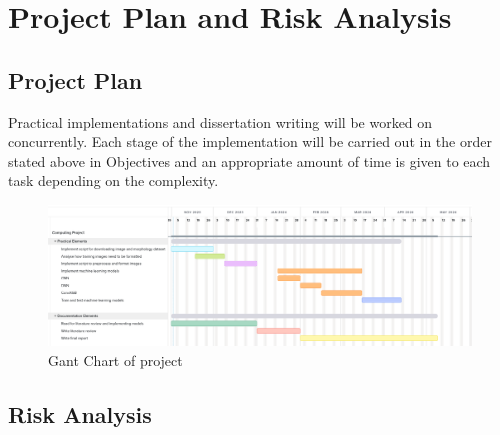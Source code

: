 \documentclass[12pt,runningheads]{llncs}
\begin{document}
\section{Project Plan and Risk Analysis}

\subsection{Project Plan}

Practical implementations and dissertation writing will be worked on
concurrently. Each stage of the implementation will be carried out in the order stated
above in Objectives and an appropriate amount of time is given to each task
depending on the complexity.

\begin{figure}
    \centering
    \caption{Gant Chart of project}\label{tab1}
    \includegraphics[width=\textwidth,scale=1.5]{GantChart.png}
\end{figure}

\newpage

\subsection{Risk Analysis}
\end{document}
